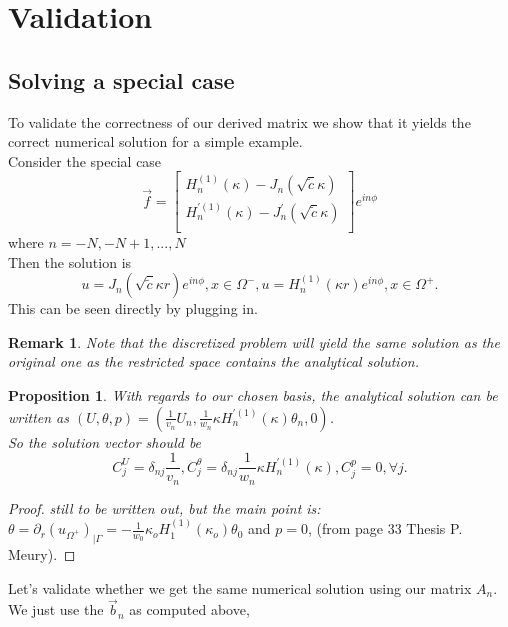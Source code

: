 \documentclass[10pt,journal,compsoc, onecolumn]{IEEEtran}
\newtheorem{proposition}[theorem]{Proposition}
\newtheorem{remark}[theorem]{Remark}
\begin{document}

\section{Validation}


\subsection{Solving a special case}
To validate the correctness of our derived matrix we show that it yields the correct numerical solution for a simple example. \\
Consider the special case
$$
\vec{f} = 
\begin{bmatrix}
    H_n^{(1)}(\kappa) -  J_n(\sqrt{\tilde c} \kappa ) \\
    H_n^{\prime (1)}(\kappa) - J_n^{\prime}(\sqrt{\tilde c} \kappa )\\
\end{bmatrix} e^{i n \phi}
$$
where $n =-N, -N+1, ..., N$ \\
Then the solution is 
$$
u = J_n(\sqrt{\tilde c} \kappa r) e^{i n \phi}, x \in \Omega^-, u = H_n^{(1)}(\kappa r)e^{i n \phi}, x \in \Omega^+.
$$
This can be seen directly by plugging in.\\
\begin{remark}
Note that the discretized problem will yield the same solution as the original one 
    as the restricted space contains the analytical solution. 
\end{remark}
\begin{proposition}
    \label{prop:anasol}
    With regards to our chosen basis, the analytical solution can be written as $(U, \theta, p) = (\frac{1}{v_n} U_n, \frac{1}{w_n} \kappa H_n^{\prime(1)}(\kappa)\theta_n, 0)$. \\
    So the solution vector should be
    $$
        C_j^U = \delta_{nj}  \frac{1}{v_n}, C_j^\theta = \delta_{nj}  \frac{1}{w_n} \kappa H_n^{\prime(1)}(\kappa), C_j^p = 0, \forall j.
    $$
\end{proposition}
\begin{proof}
    \textit{still to be written out, but the main point is:} $\theta = \partial_r(u_{\Omega^+})_{|\Gamma} = - \frac{1}{w_0} \kappa_o H_1^{(1)}(\kappa_o) \theta_0 $ and $p = 0$, (from page 33 Thesis P. Meury).
\end{proof}
Let's validate whether we get the same numerical solution using our matrix $A_n$. We just use the $\vec{b}_n$ as computed above,
\end{document}
